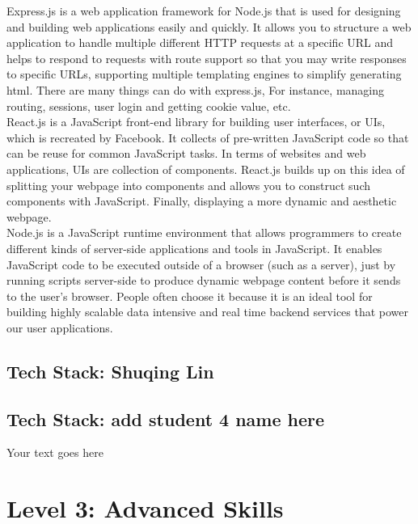 \documentclass[a4paper, 11pt]{report}
\begin{document}
\noindent Express.js is a web application framework for Node.js that is used for designing and building web applications easily and quickly. It allows you to structure a web application to handle multiple different HTTP requests at a specific URL and helps to respond to requests with route support so that you may write responses to specific URLs, supporting multiple templating engines to simplify generating html. There are many things can do with express.js, For instance, managing routing, sessions, user login and getting cookie value, etc.\\

\noindent React.js is a JavaScript front-end library for building user interfaces, or UIs, which is recreated by Facebook. It collects of pre-written JavaScript code so that can be reuse for common JavaScript tasks. In terms of websites and web applications, UIs are collection of components. React.js builds up on this idea of splitting your webpage into components and allows you to construct such components with JavaScript. Finally, displaying a more dynamic and aesthetic webpage.\\

\noindent Node.js is a JavaScript runtime environment that allows programmers to create different kinds of server-side applications and tools in JavaScript. It enables JavaScript code to be executed outside of a browser (such as a server), just by running scripts server-side to produce dynamic webpage content before it sends to the user’s browser. People often choose it because it is an ideal tool for building highly scalable data intensive and real time backend services that power our user applications.\\

\subsection{Tech Stack: Shuqing Lin}


\subsection{Tech Stack: add student 4 name here}

Your text goes here



\newpage
\section{Level 3: Advanced Skills}
\end{document}
